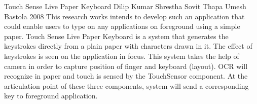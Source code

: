 \begin{conf-abstract}[]
{Touch Sense Live Paper Keyboard}
{ 
Dilip Kumar Shrestha
Sovit Thapa
Umesh Bastola
}
{2008}
This research works intends to develop such an application that could enable users to type on any applications on foreground using a simple paper. Touch Sense Live Paper Keyboard is a system that generates the keystrokes directly from a plain paper with characters drawn in it. The effect of keystrokes is seen on the application in focus. This system takes the help of camera in order to capture position of finger and keyboard (layout). OCR will recognize in paper and touch is sensed by the TouchSensor component. At the articulation point of these three components, system will send a corresponding key to foreground application.
\end{conf-abstract}